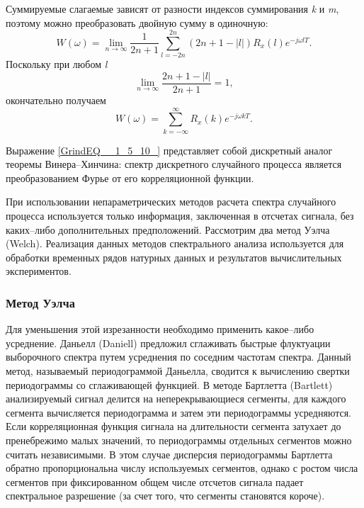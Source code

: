 Суммируемые слагаемые зависят от разности индексов суммирования \textit{k} и \textit{m}, поэтому можно преобразовать двойную сумму в одиночную:
\begin{equation} \label{GrindEQ__1_5_8_}
W(\omega )=\mathop{\lim }\limits_{n\to \infty } \frac{1}{2n+1} \sum _{l=-2n}^{2n}(2n+1-|l|)R_{x} (l)e^{-j\omega lT}  .
\end{equation}
Поскольку при любом \textit{l}
\begin{equation} \label{GrindEQ__1_5_9_}
\mathop{\lim }\limits_{n\to \infty } \frac{2n+1-|l|}{2n+1} =1,
\end{equation}
окончательно получаем
\begin{equation} \label{GrindEQ__1_5_10_}
W(\omega )=\sum _{k=-\infty }^{\infty }R_{x} (k)e^{-j\omega kT}  .
\end{equation}

Выражение \eqref{GrindEQ__1_5_10_} представляет собой дискретный аналог теоремы Винера--Хинчина: спектр дискретного случайного процесса является преобразованием Фурье от его корреляционной функции.

При использовании непараметрических методов расчета спектра случайного процесса используется только информация, заключенная в отсчетах сигнала, без каких--либо дополнительных предположений. Рассмотрим два метод Уэлча (Welch). Реализация данных методов спектрального анализа используется для обработки временных рядов натурных данных и результатов вычислительных экспериментов.


\subsubsection{Метод Уэлча }


Для уменьшения этой изрезанности необходимо применить какое--либо усреднение. Даньелл (Daniell) предложил сглаживать быстрые флуктуации выборочного спектра путем усреднения по соседним частотам спектра. Данный метод, называемый периодограммой Даньелла, сводится к вычислению свертки периодограммы со сглаживающей функцией. В методе Бартлетта (Bartlett) анализируемый сигнал делится на неперекрывающиеся сегменты, для каждого сегмента вычисляется периодограмма и затем эти периодограммы усредняются. Если корреляционная функция сигнала на длительности сегмента затухает до пренебрежимо малых значений, то периодограммы отдельных сегментов можно считать независимыми. В этом случае дисперсия периодограммы Бартлетта обратно пропорциональна числу используемых сегментов, однако с ростом числа сегментов при фиксированном общем числе отсчетов сигнала падает спектральное разрешение (за счет того, что сегменты становятся короче).

